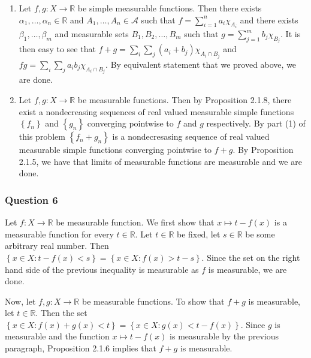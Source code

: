 \documentclass[12pt]{article}
\theoremstyle{definition}
\theoremstyle{remark}
\theoremstyle{plain}
\newcommand{\R}{\mathbb R}
\newcommand{\scrA}{{\mathscr A}}
\begin{document}
\begin{enumerate}
    \item Let $f, g: X \to \R$ be simple measurable functions. Then there exists $\alpha _1 , \ldots , \alpha _n \in \R$ and $A_1 , \ldots , A_n \in \scrA$ such that $f=\sum_{i=1}^{n} a_i \chi_{A_i}$ and 
	there exists $\beta _1 , \ldots , \beta _m$ and measurable sets $B_1 , B_2 , \ldots , B_m$ such that $g=\sum_{j=1}^{m} b_j \chi_{B_j}$. It is then easy to see that $f+g = \sum_{i}\sum_{j} \left( a_i + b_j \right) \chi_{A_i \cap B_j}$ and $fg =\sum_{i}\sum_{j} a_i b_j \chi _{A_i \cap B_j}$. By equivalent statement that we proved above, we are done.

    \item Let $f, g: X\to \R$ be measurable functions. Then by Proposition 2.1.8, there exist a nondecreasing sequences of real valued measurable simple functions $\left\{ f_n \right\}$ and $\left\{ g_n \right\}$ converging pointwise to $f$ and $g$ respectively. By part (1) of this problem $\left\{ f_n + g_n \right\}$ is a nondecresasing sequence of real valued measurable simple functions converging pointwise to $f+g$. By Proposition 2.1.5, we have that limits of measurable functions are measurable and we are done.

\end{enumerate}

\subsubsection{Question 6}
Let $f: X \to \R$ be measurable function. We first show that $x\mapsto t -f (x)$ is a measurable function for every $t\in\R$. Let $t\in \R$ be fixed, let $s\in \R$ be some arbitrary real number. Then $\left\{ x\in X : t-f(x) <s \right\}= \left\{ x\in X: f(x)>t-s \right\}$. Since the set on the right hand side of the previous inequality is measurable as $f$ is measurable, we are done.

Now, let $f,g : X \to \mathbb R$ be measurable functions. To show that $f+g$ is measurable, let $t\in\R$. Then the set $\left\{ x\in X : f(x)+g(x) <t \right\}= \left\{ x\in X: g(x) <t-f(x) \right\}$. Since $g$ is measurable and the function $x\mapsto t-f(x)$ is measurable by the previous paragraph, Proposition 2.1.6 implies that $f+g$ is measurable.
\end{document}
